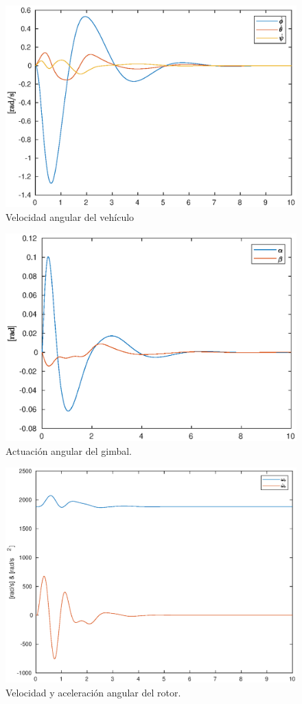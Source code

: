 \begin{figure}[!ht]
    \centering
    \includegraphics[width=1\linewidth]{fig/angvel_edf.eps}
    \caption{Velocidad angular del vehículo}
    \label{fig:angvel_edf.eps}
\end{figure}

\begin{figure}[!ht]
    \centering
    \includegraphics[width=1\linewidth]{fig/actuator_edf}
    \caption{Actuación angular del gimbal.}
    \label{fig:actuator_edf}
\end{figure}

\begin{figure}[!ht]
    \centering
    \includegraphics[width=1\linewidth]{fig/omega_simu.eps}
    \caption{Velocidad y aceleración angular del rotor.}
    \label{fig:rotor_edf}
\end{figure}



